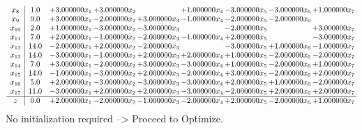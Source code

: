 \documentclass[10pt]{article}
\begin{document}
\[\begin{array}{c| c c@{\hskip 2pt} c@{\hskip 2pt} c@{\hskip 2pt} c@{\hskip 2pt} c@{\hskip 2pt} c@{\hskip 2pt} c@{\hskip 2pt} }
 x_{8}   &  1.0 & + 3.000000 x_{1} & + 3.000000 x_{2} &   & + 1.000000 x_{4} & -3.000000 x_{5} & -3.000000 x_{6} & + 1.000000 x_{7}\\
 x_{9}   &  9.0 & + 3.000000 x_{1} & -2.000000 x_{2} & + 3.000000 x_{3} & -1.000000 x_{4} & -2.000000 x_{5} & -2.000000 x_{6} &   \\
 x_{10}   &  2.0 & + 1.000000 x_{1} & -3.000000 x_{2} & -3.000000 x_{3} &   & -2.000000 x_{5} &   & + 3.000000 x_{7}\\
 x_{11}   &  7.0 & + 2.000000 x_{1} & -1.000000 x_{2} & -2.000000 x_{3} & -1.000000 x_{4} & + 2.000000 x_{5} &   & -3.000000 x_{7}\\
 x_{12}   &  14.0 & -2.000000 x_{1} & + 2.000000 x_{2} & -2.000000 x_{3} &   & -3.000000 x_{5} & + 1.000000 x_{6} & -1.000000 x_{7}\\
 x_{13}   &  14.0 & -3.000000 x_{1} & -1.000000 x_{2} & + 2.000000 x_{3} & + 2.000000 x_{4} & + 1.000000 x_{5} & -2.000000 x_{6} & -2.000000 x_{7}\\
 x_{14}   &  7.0 & + 3.000000 x_{1} & -2.000000 x_{2} & + 3.000000 x_{3} & -3.000000 x_{4} & + 1.000000 x_{5} & -2.000000 x_{6} & + 1.000000 x_{7}\\
 x_{15}   &  14.0 & -1.000000 x_{1} & -3.000000 x_{2} & + 2.000000 x_{3} & -2.000000 x_{4} & + 3.000000 x_{5} & -2.000000 x_{6} & + 2.000000 x_{7}\\
 x_{16}   &  5.0 & + 2.000000 x_{1} & -3.000000 x_{2} & -3.000000 x_{3} & -3.000000 x_{4} & + 2.000000 x_{5} & + 1.000000 x_{6} & -2.000000 x_{7}\\
 x_{17}   &  11.0 & -3.000000 x_{1} & + 2.000000 x_{2} & + 2.000000 x_{3} & -3.000000 x_{4} & -2.000000 x_{5} & + 2.000000 x_{6} & + 2.000000 x_{7}\\
\hline
z    &  0.0 & + 2.000000 x_{1} & -2.000000 x_{2} & -1.000000 x_{3} & -2.000000 x_{4} & + 2.000000 x_{5} & -2.000000 x_{6} & + 1.000000 x_{7}\\
\end{array}\]
No initialization required --> Proceed to Optimize. 
\end{document}
